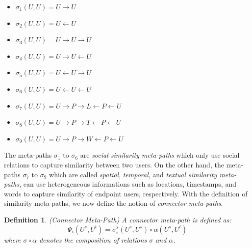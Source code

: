 \documentclass[conference]{IEEEtran}
\newtheorem{definition}{Definition}[section]
\begin{document}
\begin{itemize}
\item $\sigma_1(U,U)=U\rightarrow U$
\item $\sigma_2(U,U)=U\leftarrow U$
\item $\sigma_3(U,U)=U\rightarrow U\rightarrow U$
\item $\sigma_4(U,U)=U\rightarrow U\leftarrow U$
\item $\sigma_5(U,U)=U\leftarrow U\rightarrow U$
\item $\sigma_6(U,U)=U\leftarrow U\leftarrow U$
\item $\sigma_7(U,U)=U\rightarrow P\rightarrow L\leftarrow P\leftarrow U$
\item $\sigma_8(U,U)=U\rightarrow P\rightarrow T\leftarrow P\leftarrow U$
\item $\sigma_9(U,U)=U\rightarrow P\rightarrow W\leftarrow P\leftarrow U$
\end{itemize}

The meta-paths $\sigma_1$ to $\sigma_6$ are \textit{social similarity meta-paths} which only use social relations to capture similarity between two users. On the other hand, the meta-paths $\sigma_7$ to $\sigma_9$ which are called \textit{spatial}, \textit{temporal}, and \textit{textual similarity meta-paths}, can use heterogeneous informations such as locations, timestamps, and words to capture similarity of endpoint users, respectively. With the definition of similarity meta-paths, we now define the notion of \textit{connector meta-paths}.

\begin{definition}{(Connector Meta-Path)}
A connector meta-path is defined as:
\begin{equation}
\Psi_i(U^s,U^t)=\sigma^s_i(U^s,U^s)\circ\alpha(U^s,U^t)
\end{equation}
where $\sigma\circ\alpha$ denotes the composition of relations $\sigma$ and $\alpha$.
\end{definition}
\end{document}
